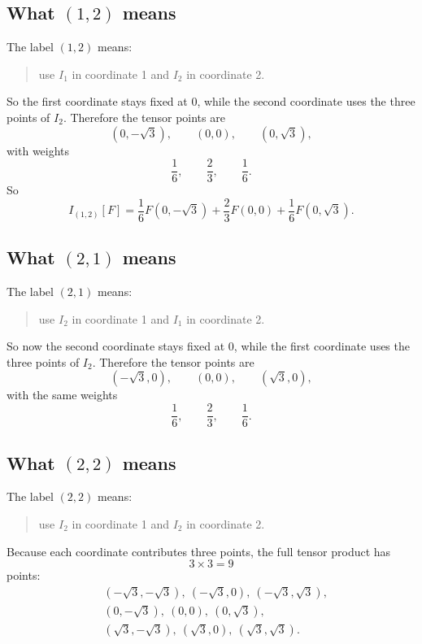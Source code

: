 \documentclass[11pt]{article}
\begin{document}
\subsection{What \texorpdfstring{\((1,2)\)}{(1,2)} means}

The label \((1,2)\) means:
\begin{quote}
use \(I_1\) in coordinate 1 and \(I_2\) in coordinate 2.
\end{quote}
So the first coordinate stays fixed at 0, while the second coordinate uses the
three points of \(I_2\).  Therefore the tensor points are
\begin{equation}
  (0,-\sqrt3),\qquad (0,0),\qquad (0,\sqrt3),
  \label{eq:tensor-12-points}
\end{equation}
with weights
\begin{equation}
  \frac16,\qquad \frac23,\qquad \frac16.
  \label{eq:tensor-12-weights}
\end{equation}
So
\begin{equation}
  I_{(1,2)}[F]
  =
  \frac16F(0,-\sqrt3)+\frac23F(0,0)+\frac16F(0,\sqrt3).
  \label{eq:I12-of-F}
\end{equation}

\subsection{What \texorpdfstring{\((2,1)\)}{(2,1)} means}

The label \((2,1)\) means:
\begin{quote}
use \(I_2\) in coordinate 1 and \(I_1\) in coordinate 2.
\end{quote}
So now the second coordinate stays fixed at 0, while the first coordinate uses
the three points of \(I_2\).  Therefore the tensor points are
\begin{equation}
  (-\sqrt3,0),\qquad (0,0),\qquad (\sqrt3,0),
  \label{eq:tensor-21-points}
\end{equation}
with the same weights
\begin{equation}
  \frac16,\qquad \frac23,\qquad \frac16.
  \label{eq:tensor-21-weights}
\end{equation}

\subsection{What \texorpdfstring{\((2,2)\)}{(2,2)} means}

The label \((2,2)\) means:
\begin{quote}
use \(I_2\) in coordinate 1 and \(I_2\) in coordinate 2.
\end{quote}
Because each coordinate contributes three points, the full tensor product has
\begin{equation}
  3\times 3=9
  \label{eq:nine-points-count}
\end{equation}
points:
\begin{align}
  &(-\sqrt3,-\sqrt3),\ (-\sqrt3,0),\ (-\sqrt3,\sqrt3),\nonumber\\
  &(0,-\sqrt3),\ (0,0),\ (0,\sqrt3),\nonumber\\
  &(\sqrt3,-\sqrt3),\ (\sqrt3,0),\ (\sqrt3,\sqrt3).
  \label{eq:nine-point-grid}
\end{align}
\end{document}
